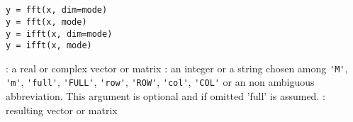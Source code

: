 
\begin{mandesc}
  \\
  \\
\end{mandesc}

\begin{calling_sequence}
\begin{verbatim}
y = fft(x, dim=mode)
y = fft(x, mode)
y = ifft(x, dim=mode)
y = ifft(x, mode)
\end{verbatim}
\end{calling_sequence}
\begin{parameters}
  \begin{varlist}
    : a real or complex vector or matrix
    : an integer or a string chosen among \verb+'M'+, \verb+'m'+, \verb+'full'+, \verb+'FULL'+, \verb+'row'+,
    \verb+'ROW'+, \verb+'col'+, \verb+'COL'+ or an non ambiguous abbreviation. 
    This argument is optional and if omitted 'full' is assumed.
    : resulting vector or matrix
  \end{varlist}
\end{parameters}

